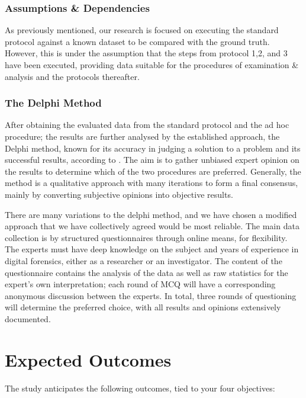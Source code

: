 \documentclass[a4paper]{report}
\begin{document}
\begin{justify}
\begin{table}[H]
\begin{tabular}{|p{4cm}|p{5cm}|p{5cm}|}
\end{tabular}

\end{table}

\subsection{Assumptions \& Dependencies}
As previously mentioned, our research is focused on executing the standard protocol against a known dataset to be compared with the ground truth. However, this is under the assumption that the steps from protocol 1,2, and 3 have been executed, providing data suitable for the procedures of examination \& analysis and the protocols thereafter. 

\subsection{The Delphi Method}
After obtaining the evaluated data from the standard protocol and the ad hoc procedure; the results are further analysed by the established approach, the Delphi method, known for its accuracy in judging a solution to a problem and its successful results, according to \cite{ablatif2017delphi}. The aim is to gather unbiased expert opinion on the results to determine which of the two procedures are preferred. Generally, the method is a qualitative approach with many iterations to form a final consensus, mainly by converting subjective opinions into objective results. 

There are many variations to the delphi method, and we have chosen a modified approach that we have collectively agreed would be most reliable. The main data collection is by structured questionnaires through online means, for flexibility. The experts must have deep knowledge on the subject and years of experience in digital forensics, either as a researcher or an investigator. The content of the questionnaire contains the analysis of the data as well as raw statistics for the expert’s own interpretation; each round of MCQ will have a corresponding anonymous discussion between the experts. In total, three rounds of questioning will determine the preferred choice, with all results and opinions extensively documented. 

\chapter{Expected Outcomes}

The study anticipates the following outcomes, tied to your four objectives:


\end{justify}
\end{document}
